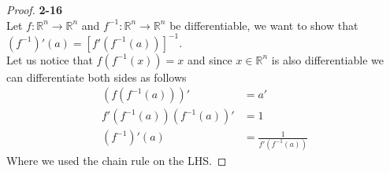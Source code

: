 \documentclass[11pt]{article}
\newcommand{\R}{\mathbb{R}}
\theoremstyle{definition}
\begin{document}
\cleardoublepage
\begin{proof}{\textbf{2-16}}\\
Let $f:\R^n \to \R^n$ and $f^{-1}:\R^n\to\R^n$ be differentiable, we want to
show that $(f^{-1})'(a) = [f'(f^{-1}(a))]^{-1}$.
\\
Let us notice that $f(f^{-1}(x)) = x$ and since $x\in \R^n$ is also
differentiable we can differentiate both sides as follows
\begin{align*}
    (f(f^{-1}(a)))' &= a'\\
    f'(f^{-1}(a))(f^{-1}(a))' &= 1\\
    (f^{-1})'(a) &= \frac{1}{f'(f^{-1}(a))}
\end{align*}
Where we used the chain rule on the LHS.
\end{proof}

\cleardoublepage
\end{document}
